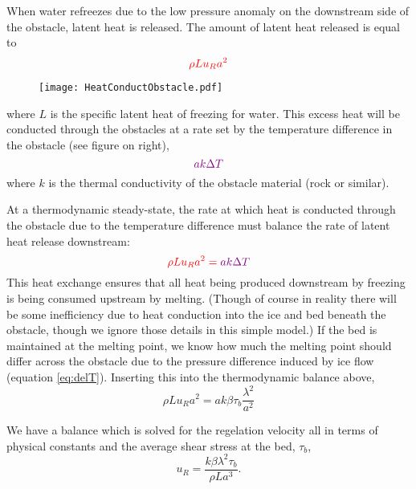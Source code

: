 \documentclass[12pt]{article}
\theoremstyle{definition}
\begin{document}
When water refreezes due to the low pressure anomaly on the downstream side of the obstacle, latent heat is released. The amount of latent heat released is equal to
\begin{equation}
\color{red}{\rho L u_R a^2}
\end{equation}
\begin{wrapfigure}{r}{0.5\textwidth}
  \begin{center}
\texttt{[image: HeatConductObstacle.pdf]}
  \end{center}
  \vspace{-20pt}
\end{wrapfigure}
where $L$ is the specific latent heat of freezing for water. This excess heat will be conducted through the obstacles at a rate set by the temperature difference in the obstacle (see figure on right), 
\begin{equation}
\color{violet}{a k \Delta T}
\end{equation} 
where $k$ is the thermal conductivity of the obstacle material (rock or similar). 

At a thermodynamic steady-state, the rate at which heat is conducted through the obstacle due to the temperature difference must balance the rate of latent heat release downstream:
\begin{equation}
\color{red}{\rho L u_R a^2} = \color{violet}{a k \Delta T}
\end{equation}
This heat exchange ensures that all heat being produced downstream by freezing is being consumed upstream by melting. (Though of course in reality there will be some inefficiency due to heat conduction into the ice and bed beneath the obstacle, though we ignore those details in this simple model.) If the bed is maintained at the melting point, we know how much the melting point should differ across the obstacle due to the pressure difference induced by ice flow (equation \ref{eq:delT}). Inserting this into the thermodynamic balance above, 
\begin{equation}
\rho L u_R a^2 = a k \beta \tau_b \frac{\lambda^2}{a^2}
\end{equation}
\begin{shaded}
We have a balance which is solved for the regelation velocity all in terms of physical constants and the average shear stress at the bed, $\tau_b$,
\begin{equation}
u_R = \frac{k \beta \lambda^2 \tau_b}{\rho L a^3} .
\end{equation}
\end{shaded}
\end{document}
